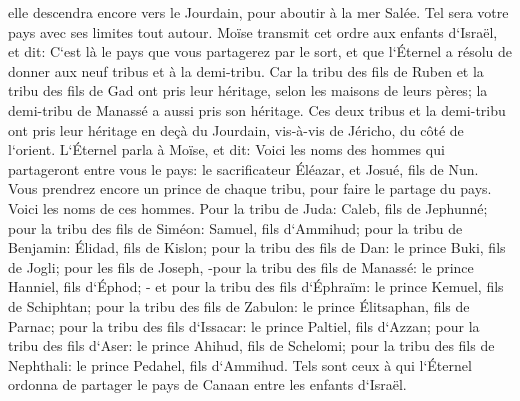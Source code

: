 \verse elle descendra encore vers le Jourdain, pour aboutir à la mer Salée. Tel sera votre pays avec ses limites tout autour. 
\verse Moïse transmit cet ordre aux enfants d`Israël, et dit: C`est là le pays que vous partagerez par le sort, et que l`Éternel a résolu de donner aux neuf tribus et à la demi-tribu. 
\verse Car la tribu des fils de Ruben et la tribu des fils de Gad ont pris leur héritage, selon les maisons de leurs pères; la demi-tribu de Manassé a aussi pris son héritage. 
\verse Ces deux tribus et la demi-tribu ont pris leur héritage en deçà du Jourdain, vis-à-vis de Jéricho, du côté de l`orient. 
\verse L`Éternel parla à Moïse, et dit: 
\verse Voici les noms des hommes qui partageront entre vous le pays: le sacrificateur Éléazar, et Josué, fils de Nun. 
\verse Vous prendrez encore un prince de chaque tribu, pour faire le partage du pays. 
\verse Voici les noms de ces hommes. Pour la tribu de Juda: Caleb, fils de Jephunné; 
\verse pour la tribu des fils de Siméon: Samuel, fils d`Ammihud; 
\verse pour la tribu de Benjamin: Élidad, fils de Kislon; 
\verse pour la tribu des fils de Dan: le prince Buki, fils de Jogli; 
\verse pour les fils de Joseph, -pour la tribu des fils de Manassé: le prince Hanniel, fils d`Éphod; - 
\verse et pour la tribu des fils d`Éphraïm: le prince Kemuel, fils de Schiphtan; 
\verse pour la tribu des fils de Zabulon: le prince Élitsaphan, fils de Parnac; 
\verse pour la tribu des fils d`Issacar: le prince Paltiel, fils d`Azzan; 
\verse pour la tribu des fils d`Aser: le prince Ahihud, fils de Schelomi; 
\verse pour la tribu des fils de Nephthali: le prince Pedahel, fils d`Ammihud. 
\verse Tels sont ceux à qui l`Éternel ordonna de partager le pays de Canaan entre les enfants d`Israël. 

\chapter{}

